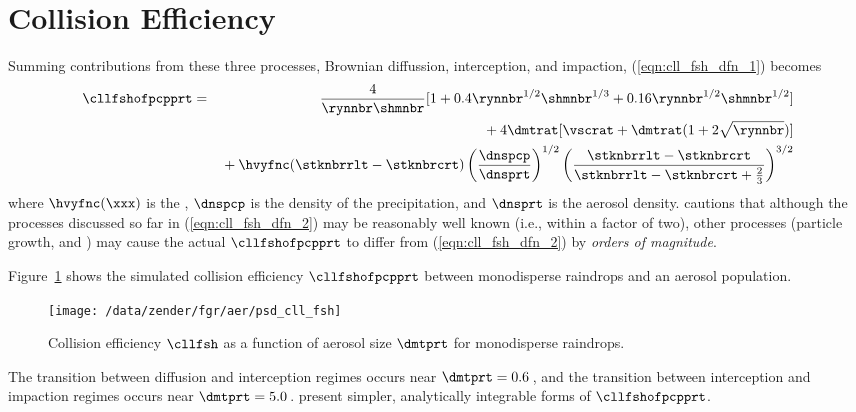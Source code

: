 \documentclass[12pt,twoside]{book}
\begin{document}
\section[Collision Efficiency]{Collision Efficiency}\label{sxn:cll_fsh}
Summing contributions from these three processes, Brownian diffussion,
interception, and impaction, (\ref{eqn:cll_fsh_dfn_1}) becomes
\begin{eqnarray}
\cllfshofpcpprt & = & 
\frac{4}{\rynnbr \shmnbr } 
[ 1 + 0.4 \rynnbr^{1/2} \shmnbr^{1/3} + 0.16 \rynnbr^{1/2} \shmnbr^{1/2} ]
\nonumber \\ 
& & %
{} + 4 \dmtrat [ \vscrat +
\dmtrat ( 1 + 2 \sqrt{\rynnbr} ) ]
\nonumber \\
& & %
{} + \hvyfnc ( \stknbrrlt - \stknbrcrt )
\left( \frac{\dnspcp}{\dnsprt } \right)^{1/2}
\left( \frac{\stknbrrlt - \stknbrcrt }{
\stknbrrlt - \stknbrcrt + \frac{2}{3} } \right)^{3/2}
\label{eqn:cll_fsh_dfn_2}
\end{eqnarray}
where $\hvyfnc ( \xxx )$ is the , 
$\dnspcp$ is the density of the precipitation, and $\dnsprt$ is the
aerosol density.  
\cite{Sli82} cautions that although the processes discussed so far in
(\ref{eqn:cll_fsh_dfn_2}) may be reasonably well known (i.e., within a
factor of two), other processes (particle growth,
 and ) may cause the
actual $\cllfshofpcpprt$ to differ from (\ref{eqn:cll_fsh_dfn_2}) by
\textit{orders of magnitude}. 

Figure~\ref{fgr:cll_fsh} shows the simulated collision efficiency
$\cllfshofpcpprt$ between monodisperse raindrops
and an aerosol population. 
\begin{figure*}
\begin{center}
\texttt{[image: /data/zender/fgr/aer/psd\_cll\_fsh]}\vfill
\end{center}
\caption[Collision Efficiency]{
Collision efficiency $\cllfsh$ as a function of aerosol size
$\dmtprt$ for monodisperse raindrops.
\label{fgr:cll_fsh}}
\end{figure*}
The transition between diffusion and interception regimes occurs near
$\dmtprt = 0.6$\,\um, and the transition between interception and
impaction regimes occurs near $\dmtprt = 5.0$\,\um.
\cite{DaH76} present simpler, analytically integrable forms of
$\cllfshofpcpprt$. 
\end{document}
